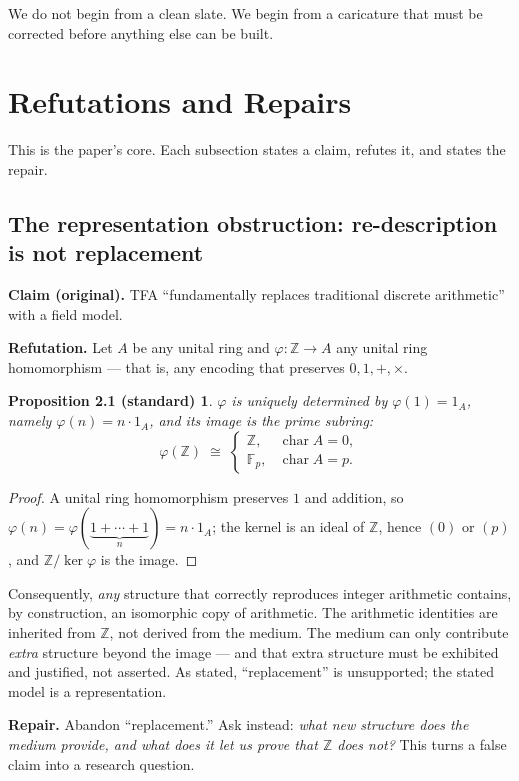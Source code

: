 \documentclass[11pt]{article}
\newtheorem*{propno}{Proposition 2.1 (standard)}
\begin{document}
We do not begin from a clean slate. We begin from a caricature that must be
corrected before anything else can be built.

\section{Refutations and Repairs}

This is the paper's core. Each subsection states a claim, refutes it, and states
the repair.

\subsection{The representation obstruction: re-description is not replacement}

\textbf{Claim (original).} TFA ``fundamentally replaces traditional discrete
arithmetic'' with a field model.

\noindent\textbf{Refutation.} Let $A$ be any unital ring and
$\varphi:\mathbb{Z}\to A$ any unital ring homomorphism --- that is, any encoding
that preserves $0,1,+,\times$.

\begin{propno}
$\varphi$ is uniquely determined by $\varphi(1)=1_A$, namely
$\varphi(n)=n\cdot 1_A$, and its image is the prime subring:
\[
\varphi(\mathbb{Z}) \;\cong\; \begin{cases} \mathbb{Z}, & \operatorname{char} A = 0,\\ \mathbb{F}_p, & \operatorname{char} A = p.\end{cases}
\]
\end{propno}
\begin{proof}
A unital ring homomorphism preserves $1$ and addition, so
$\varphi(n)=\varphi(\underbrace{1+\cdots+1}_{n})=n\cdot 1_A$; the kernel is an
ideal of $\mathbb{Z}$, hence $(0)$ or $(p)$, and
$\mathbb{Z}/\ker\varphi$ is the image.
\end{proof}

Consequently, \emph{any} structure that correctly reproduces integer arithmetic
contains, by construction, an isomorphic copy of arithmetic. The arithmetic
identities are inherited from $\mathbb{Z}$, not derived from the medium. The
medium can only contribute \emph{extra} structure beyond the image --- and that
extra structure must be exhibited and justified, not asserted. As stated,
``replacement'' is unsupported; the stated model is a representation.

\noindent\textbf{Repair.} Abandon ``replacement.'' Ask instead: \emph{what new
structure does the medium provide, and what does it let us prove that
$\mathbb{Z}$ does not?} This turns a false claim into a research question.
\end{document}
